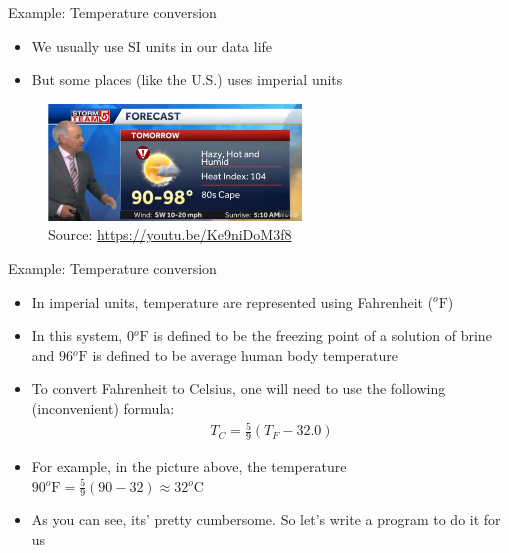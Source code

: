 \documentclass[10pt,xcolor={table,dvipsnames},t]{beamer}
\begin{document}
\begin{frame}{Example: Temperature conversion}
  \begin{itemize}
    \item We usually use SI units in our data life 
    \item But some places (like the U.S.) uses imperial units
  \end{itemize}
  \vspace{2mm}
  \begin{figure}
    \centering
    \includegraphics[width=0.6\textwidth]{img/fahrenheit.PNG}
    \caption*{Source: \href{https://youtu.be/Ke9niDoM3f8}{https://youtu.be/Ke9niDoM3f8}}
  \end{figure}
\end{frame}

\begin{frame}{Example: Temperature conversion}
  \begin{itemize}
    \item In imperial units, temperature are represented using Fahrenheit (${}^o \text{F}$)
    \item In this system, $0 {}^o \text{F}$ is defined to be the freezing point of a solution of brine and $96 {}^o \text{F}$ is defined to be average human body temperature
    \item To convert Fahrenheit to Celsius, one will need to use the following (inconvenient) formula:
    \begin{align*}
      T_C = \frac{5}{9} \left(T_F - 32.0\right)
    \end{align*}
    \item For example, in the picture above, the temperature  $90 {}^o \text{F} = \frac{5}{9} (90-32) \approx 32 {}^o \text{C}$
    \item As you can see, its' pretty cumbersome. So let's write a program to do it for us
  \end{itemize}
\end{frame}
\end{document}
